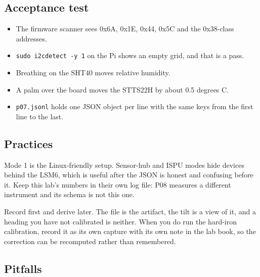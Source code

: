 \subsection*{Acceptance test}

\begin{itemize}
\item The firmware scanner sees 0x6A, 0x1E, 0x44, 0x5C and the 0x38-class addresses.
\item \texttt{sudo i2cdetect -y 1} on the Pi shows an empty grid, and that is a pass.
\item Breathing on the SHT40 moves relative humidity.
\item A palm over the board moves the STTS22H by about 0.5 degrees C.
\item \texttt{p07.jsonl} holds one JSON object per line with the same keys from the first
line to the last.
\end{itemize}

\subsection*{Practices}

Mode 1 is the Linux-friendly setup. Sensor-hub and ISPU modes hide devices behind the
LSM6, which is useful after the JSON is honest and confusing before it. Keep this lab's
numbers in their own log file: P08 measures a different instrument and its schema is not
this one.

Record first and derive later. The file is the artifact, the tilt is a view of it, and a
heading you have not calibrated is neither. When you do run the hard-iron calibration,
record it as its own capture with its own note in the lab book, so the correction can be
recomputed rather than remembered.

\subsection*{Pitfalls}

